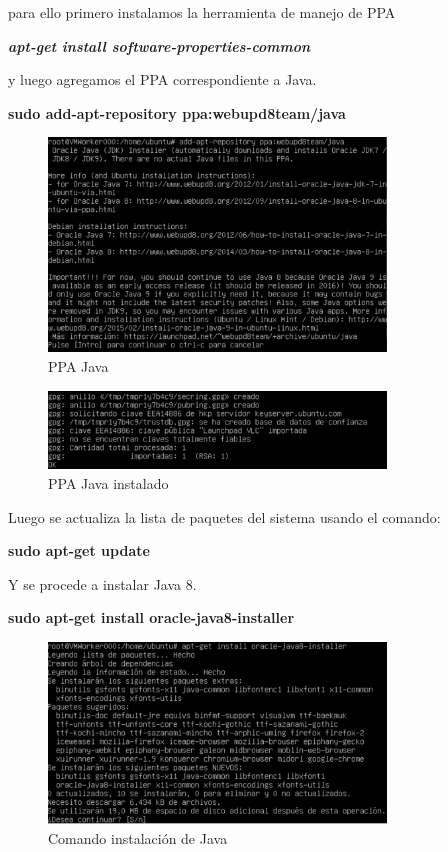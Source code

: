 para ello primero instalamos la herramienta de manejo de PPA

\textbf{\textit{apt-get install software-properties-common}}

y luego agregamos el PPA correspondiente a Java.

\textbf{sudo add-apt-repository ppa:webupd8team/java}

\begin{figure}[h]
\centering
\includegraphics[width=0.8\textwidth]{Figures/ppajava.png}
\decoRule
\caption{PPA Java}
\label{fig:ppa java}
\end{figure}
\FloatBarrier

\begin{figure}[h]
\centering
\includegraphics[width=0.8\textwidth]{Figures/ppajavaok.png}
\decoRule
\caption{PPA Java instalado}
\label{fig:ppa java aceptación}
\end{figure}
\FloatBarrier
Luego se actualiza la lista de paquetes del sistema usando el comando:

\textbf{sudo apt-get update}

Y se procede a instalar Java 8.

\textbf{sudo apt-get install oracle-java8-installer}
\begin{figure}[h]
\centering
\includegraphics[width=0.8\textwidth]{Figures/javainstall.png}
\decoRule
\caption{Comando instalación de Java}
\label{fig:Java install command}
\end{figure}
\FloatBarrier

